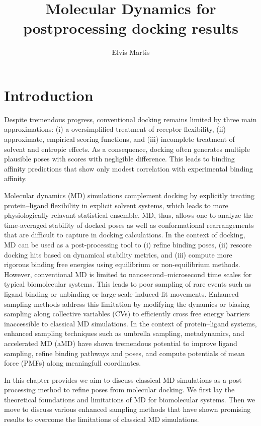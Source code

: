 \documentclass[12pt]{article}
\title{Molecular Dynamics for postprocessing docking results}
\author{Elvis Martis}
\date{}
\begin{document}
\maketitle

\section{Introduction}

 Despite tremendous progress, conventional docking remains limited by three main approximations: (i) a oversimplified treatment of receptor flexibility, (ii) approximate, empirical scoring functions, and (iii) incomplete treatment of solvent and entropic effects.\cite{CH9_Warren2006,CH9_Chen2014} As a consequence, docking often generates multiple plausible poses with scores with negligible difference. This leads to binding affinity predictions that show only modest correlation with experimental binding affinity.

Molecular dynamics (MD) simulations complement docking by explicitly treating protein--ligand flexibility in explicit solvent systems, which leads to more physiologically relavant statistical ensemble.\cite{CH9_McCammon1977,CH9_FrenkelSmit2023,CH9_Hollingsworth2018} MD, thus, allows one to analyze the time-averaged stability of docked poses as well as conformational rearrangements that are difficult to capture in docking calculations. In the context of docking, MD can be used as a post-processing tool to (i) refine binding poses, (ii) rescore docking hits based on dynamical stability metrics, and (iii) compute more rigorous binding free energies using equilibrium or non-equilibrium methods. However, conventional MD is limited to nanosecond--microsecond time scales for typical biomolecular systems. This leads to poor sampling of rare events such as ligand binding or unbinding or large-scale induced-fit movements. Enhanced sampling methods address this limitation by modifying the dynamics or biasing sampling along collective variables (CVs) to efficiently cross free energy barriers inaccessible to classical MD simulations.\cite{CH9_Tiwary2015} In the context of protein--ligand systems, enhanced sampling techniques such as umbrella sampling, metadynamics, and accelerated MD (aMD) have shown tremendous potential to improve ligand sampling, refine binding pathways and poses, and compute potentials of mean force (PMFs) along meaningfull coordinates.

In this chapter provides we aim to discuss classical MD simulations as a post-processing method to refine poses from molecular docking. We first lay the theoretical foundations and limitations of MD for biomolecular systems. Then we move to discuss various enhanced sampling methods that have shown promising results to overcome the limitations of classical MD simulations. 
\end{document}
